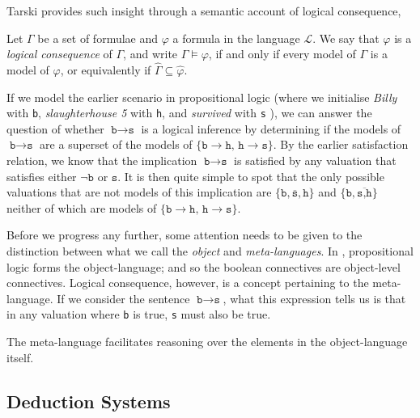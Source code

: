 Tarski \cite[p. 410]{turquette1957logic} provides such insight through a semantic account of logical consequence,

\begin{definition}
     \label{definition:logical-consequence}
     Let $\Gamma$ be a set of formulae and $\varphi$ a formula in the language $\mathcal{L}$. We say that $\varphi$ is a \textit{logical consequence} of $\Gamma$, and write $\Gamma \models \varphi$, if and only if every model of $\Gamma$ is a model of $\varphi$, or equivalently if $\hat{\Gamma} \subseteq \hat{\varphi}$.
\end{definition}

\begin{example}
     \label{example-logical-consequence}   
If we model the earlier scenario in propositional logic (where we initialise \textit{Billy} with \texttt{b}, \textit{slaughterhouse 5} with \texttt{h}, and \textit{survived} with \texttt{s} ), we can answer the question of whether $\texttt{b} \rightarrow \texttt{s}$ is a logical inference by determining if the models of $\texttt{b} \rightarrow \texttt{s}$ are a superset of the models of $\{ \texttt{b} \rightarrow \texttt{h, h} \rightarrow \texttt{s}\}$. By the earlier satisfaction relation, we know that the implication $\texttt{b} \rightarrow \texttt{s}$ is satisfied by any valuation that satisfies either $\neg \texttt{b}$ or $\texttt{s}$. It is then quite simple to spot that the only possible valuations that are not models of this implication are $\{\texttt{b},\overline{\texttt{s}}, \texttt{h}\}$ and $\{\texttt{b},\overline{\texttt{s,h}}\}$ neither of which are models of $\{ \texttt{b} \rightarrow \texttt{h, h} \rightarrow \texttt{s}\}$. 
\end{example}

Before we progress any further, some attention needs to be given to the distinction between what we call the \textit{object} and \textit{meta-languages}. In , propositional logic forms the object-language; and so the boolean connectives are object-level connectives. Logical consequence, however, is a concept pertaining to the meta-language. If we consider the sentence $\texttt{b} \rightarrow \texttt{s}$, what this expression tells us is that in any valuation where \texttt{b} is true, \texttt{s} must also be true. 

The meta-language facilitates reasoning over the elements in the object-language itself. 


\subsection{Deduction Systems}
\label{subsection:deduction-systems}




